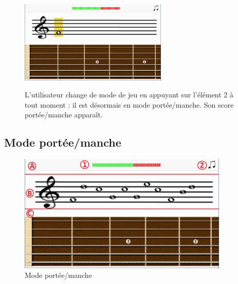 \documentclass{scrreprt}
\begin{document}
\begin{figure}[!ht]
  \begin{minipage}{0.55\linewidth}
    \includegraphics[width=7cm]{images/maquette_usecase/portee/question_une_note_1.png}
  \end{minipage}\hfill
  \begin{minipage}{0.5\linewidth}
  {L'utilisateur change de mode de jeu en appuyant sur l'élément 2 à tout moment : il est désormais en mode portée/manche. Son score portée/manche apparaît.}
   \end{minipage}
\end{figure}


\newpage

\subsection{Mode portée/manche}

\begin{figure}[!h]
        \centering
        \includegraphics[width=10cm]{images/maquette_usecase/portee/portee_zones_ecran.png}
        \caption{Mode portée/manche}
        \label{fig:portee}
\end{figure}
\end{document}
